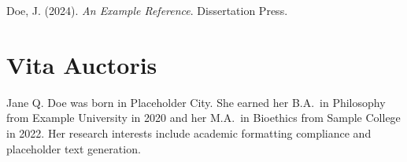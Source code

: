 \documentclass[12pt,oneside]{book}
\begin{document}
\backmatter
\singlespacing
\begin{thebibliography}{99}
 Doe, J. (2024). \textit{An Example Reference}. Dissertation Press.
\end{thebibliography}
\doublespacing

\chapter*{Vita Auctoris}
Jane Q. Doe was born in Placeholder City. She earned her B.A.\ in Philosophy
from Example University in 2020 and her M.A.\ in Bioethics from Sample College
in 2022. Her research interests include academic formatting compliance and
placeholder text generation.
\end{document}
